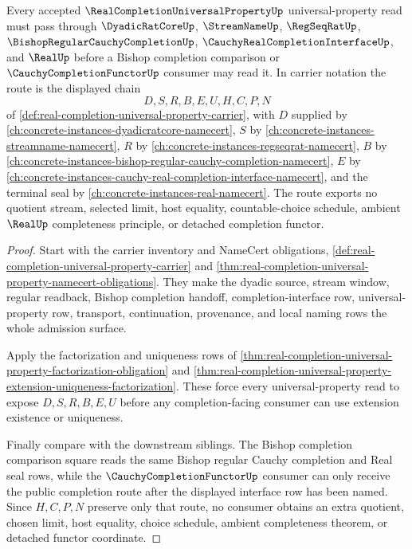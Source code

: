 \begin{theorem}
\label{thm:real-completion-universal-property-sibling-route}
Every accepted $\RealCompletionUniversalPropertyUp$ universal-property read must pass through $\DyadicRatCoreUp$, $\StreamNameUp$, $\RegSeqRatUp$, $\BishopRegularCauchyCompletionUp$, $\CauchyRealCompletionInterfaceUp$, and $\RealUp$ before a Bishop completion comparison or $\CauchyCompletionFunctorUp$ consumer may read it. In carrier notation the route is the displayed chain
$$
D,S,R,B,E,U,H,C,P,N
$$
of \autoref{def:real-completion-universal-property-carrier}, with $D$ supplied by \autoref{ch:concrete-instances-dyadicratcore-namecert}, $S$ by \autoref{ch:concrete-instances-streamname-namecert}, $R$ by \autoref{ch:concrete-instances-regseqrat-namecert}, $B$ by \autoref{ch:concrete-instances-bishop-regular-cauchy-completion-namecert}, $E$ by \autoref{ch:concrete-instances-cauchy-real-completion-interface-namecert}, and the terminal seal by \autoref{ch:concrete-instances-real-namecert}. The route exports no quotient stream, selected limit, host equality, countable-choice schedule, ambient $\RealUp$ completeness principle, or detached completion functor.
\end{theorem}
\begin{proof}
Start with the carrier inventory and NameCert obligations, \autoref{def:real-completion-universal-property-carrier} and \autoref{thm:real-completion-universal-property-namecert-obligations}. They make the dyadic source, stream window, regular readback, Bishop completion handoff, completion-interface row, universal-property row, transport, continuation, provenance, and local naming rows the whole admission surface.

Apply the factorization and uniqueness rows of \autoref{thm:real-completion-universal-property-factorization-obligation} and \autoref{thm:real-completion-universal-property-extension-uniqueness-factorization}. These force every universal-property read to expose $D,S,R,B,E,U$ before any completion-facing consumer can use extension existence or uniqueness.

Finally compare with the downstream siblings. The Bishop completion comparison square reads the same Bishop regular Cauchy completion and Real seal rows, while the $\CauchyCompletionFunctorUp$ consumer can only receive the public completion route after the displayed interface row has been named. Since $H,C,P,N$ preserve only that route, no consumer obtains an extra quotient, chosen limit, host equality, choice schedule, ambient completeness theorem, or detached functor coordinate.
\end{proof}

